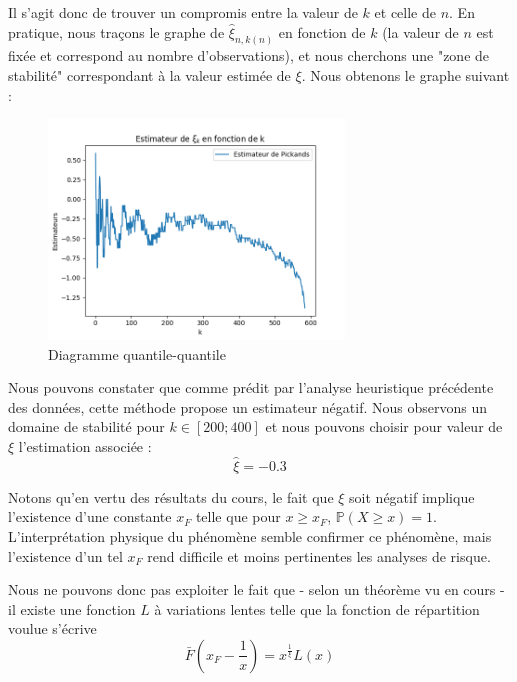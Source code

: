 \documentclass[../report.tex]{subfiles}
\begin{document}
\par Il s'agit donc de trouver un compromis entre la valeur de $k$ et celle de $n$. En pratique, nous traçons le graphe de $ \hat{\xi}_{n, k \left( n \right)}$ en fonction de $k$ (la valeur de $n$ est fixée et correspond au nombre d'observations), et nous cherchons une "zone de stabilité" correspondant à la valeur estimée de $\xi$. Nous obtenons le graphe suivant : 
\begin{figure}[H]
  \centering
    \includegraphics[width=0.7\textwidth]{images/part_2/pickands.png}
  \caption{Diagramme quantile-quantile}
\end{figure}

\par Nous pouvons constater que comme prédit par l'analyse heuristique précédente des données, cette méthode propose un estimateur négatif. Nous observons un domaine de stabilité pour $k \in \left[ 200; 400 \right]$ et nous pouvons choisir pour valeur de $\xi$ l'estimation associée :
\begin{displaymath}
\hat{\xi} = -0.3
\end{displaymath}
\par Notons qu'en vertu des résultats du cours, le fait que $\xi$ soit négatif implique l'existence d'une constante $x_F$ telle que pour $x \geq x_F$, $\mathbb{P} \left( X \geq x \right) = 1$. L'interprétation physique du phénomène semble confirmer ce phénomène, mais l'existence d'un tel $x_F$ rend difficile et moins pertinentes les analyses de risque.

\par Nous ne pouvons donc pas exploiter le fait que - selon un théorème vu en cours - il existe une fonction $L$ à variations lentes telle que la fonction de répartition voulue s'écrive
\begin{displaymath}
\bar{F} \left( x_F - \frac{1}{x} \right) = x^{\frac{1}{\xi}} L \left( x \right)
\end{displaymath}
\end{document}
